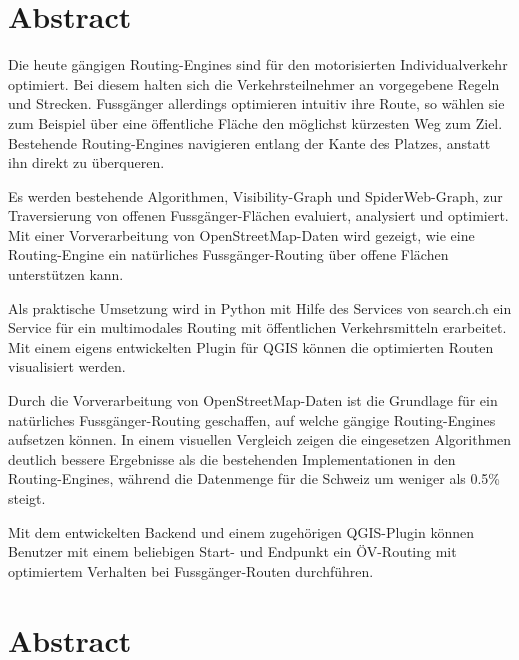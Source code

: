 
\chapter*{Abstract}

Die heute gängigen Routing-Engines sind für den motorisierten Individualverkehr optimiert. Bei diesem halten sich die Verkehrsteilnehmer an vorgegebene Regeln und Strecken. Fussgänger allerdings optimieren intuitiv ihre Route, so wählen sie zum Beispiel über eine öffentliche Fläche den möglichst kürzesten Weg zum Ziel. Bestehende Routing-Engines navigieren entlang der Kante des Platzes, anstatt ihn direkt zu überqueren.

Es werden bestehende Algorithmen, Visibility-Graph und SpiderWeb-Graph, zur Traversierung von offenen Fussgänger-Flächen evaluiert, analysiert und optimiert. Mit einer Vorverarbeitung von OpenStreetMap-Daten wird gezeigt, wie eine Routing-Engine ein natürliches Fussgänger-Routing über offene Flächen unterstützen kann.

Als praktische Umsetzung wird in Python mit Hilfe des Services von search.ch ein Service für ein multimodales Routing mit öffentlichen Verkehrsmitteln erarbeitet. Mit einem eigens entwickelten Plugin für QGIS können die optimierten Routen visualisiert werden.

Durch die Vorverarbeitung von OpenStreetMap-Daten ist die Grundlage für ein natürliches Fussgänger-Routing geschaffen, auf welche gängige Routing-Engines aufsetzen können. In einem visuellen Vergleich zeigen die eingesetzen Algorithmen  deutlich bessere Ergebnisse als die bestehenden Implementationen in den Routing-Engines, während die Datenmenge für die Schweiz um weniger als 0.5\% steigt.

Mit dem entwickelten Backend und einem zugehörigen QGIS-Plugin können Benutzer mit einem beliebigen Start- und Endpunkt ein ÖV-Routing mit optimiertem Verhalten bei Fussgänger-Routen durchführen.

\cleardoublepage

\chapter*{Abstract}

